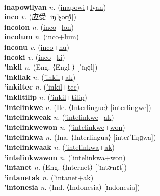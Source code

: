  \label{inapowilon} \\
\textbf{inapowilyan} \textit{n.} (\hyperref[inapowi]{inapowi}+\hyperref[lyan]{lyan})
 \label{inapowilyan} \\
\textbf{inco} \textit{v.} ({\chinese{}应受} [iŋ˥ʂoʊ̯˥˩])
 \label{inco} \\
\textbf{incolon} \textit{n.} (\hyperref[inco]{inco}+\hyperref[lon]{lon})
 \label{incolon} \\
\textbf{incolum} \textit{n.} (\hyperref[inco]{inco}+\hyperref[lum]{lum})
 \label{incolum} \\
\textbf{inconu} \textit{v.} (\hyperref[inco]{inco}+\hyperref[nu]{nu})
 \label{inconu} \\
\textbf{incoki} \textit{v.} (\hyperref[inco]{inco}+\hyperref[ki]{ki})
 \label{incoki} \\
\textbf{'inkil} \textit{n.} (Eng. ⟨Engl-⟩ [ˈɪŋɡl])
 \label{'inkil} \\
\textbf{'inkilak} \textit{n.} (\hyperref['inkil]{'inkil}+\hyperref[ak]{ak})
 \label{'inkilak} \\
\textbf{'inkiltec} \textit{n.} (\hyperref['inkil]{'inkil}+\hyperref[tec]{tec})
 \label{'inkiltec} \\
\textbf{'inkiltilip} \textit{n.} (\hyperref['inkil]{'inkil}+\hyperref[tilip]{tilip})
 \label{'inkiltilip} \\
\textbf{'intelinkwe} \textit{n.} (Ile. ⟨Interlingue⟩ [interlingwe])
 \label{'intelinkwe} \\
\textbf{'intelinkweak} \textit{n.} (\hyperref['intelinkwe]{'intelinkwe}+\hyperref[ak]{ak})
 \label{'intelinkweak} \\
\textbf{'intelinkwewon} \textit{n.} (\hyperref['intelinkwe]{'intelinkwe}+\hyperref[won]{won})
 \label{'intelinkwewon} \\
\textbf{'intelinkwa} \textit{n.} (Ina. ⟨Interlingua⟩ [inteɾˈliŋɡwa])
 \label{'intelinkwa} \\
\textbf{'intelinkwaak} \textit{n.} (\hyperref['intelinkwa]{'intelinkwa}+\hyperref[ak]{ak})
 \label{'intelinkwaak} \\
\textbf{'intelinkwawon} \textit{n.} (\hyperref['intelinkwa]{'intelinkwa}+\hyperref[won]{won})
 \label{'intelinkwawon} \\
\textbf{'intanet} \textit{n.} (Eng. ⟨Internet⟩ [ˈɪntɚnɛt])
 \label{'intanet} \\
\textbf{'intanetak} \textit{n.} (\hyperref['intanet]{'intanet}+\hyperref[ak]{ak})
 \label{'intanetak} \\
\textbf{'intonesia} \textit{n.} (Ind. ⟨Indonesia⟩ [ɪndonesia])
